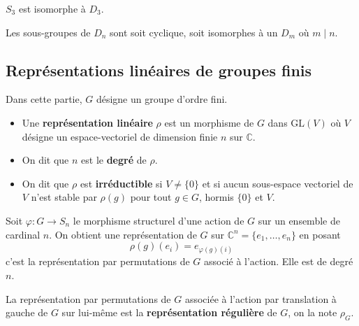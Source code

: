   \begin{example}
    $S_3$ est isomorphe à $D_3$.
  \end{example}


  \begin{proposition}
    Les sous-groupes de $D_n$ sont soit cyclique, soit isomorphes à un $D_m$ où $m \mid n$.
  \end{proposition}

  \subsection{Représentations linéaires de groupes finis}


  Dans cette partie, $G$ désigne un groupe d'ordre fini.

  \begin{definition}
    \begin{itemize}
      \item Une \textbf{représentation linéaire} $\rho$ est un morphisme de $G$ dans $\mathrm{GL}(V)$ où $V$ désigne un espace-vectoriel de dimension finie $n$ sur $\mathbb{C}$.
      \item On dit que $n$ est le \textbf{degré} de $\rho$.
      \item On dit que $\rho$ est \textbf{irréductible} si $V \neq \{ 0 \}$ et si aucun sous-espace vectoriel de $V$ n'est stable par $\rho(g)$ pour tout $g \in G$, hormis $\{ 0 \}$ et $V$.
    \end{itemize}
  \end{definition}

  \begin{example}
    Soit $\varphi : G \rightarrow S_n$ le morphisme structurel d'une action de $G$ sur un ensemble de cardinal $n$. On obtient une représentation de $G$ sur $\mathbb{C}^n = \{ e_1, \dots, e_n \}$ en posant
    \[ \rho(g)(e_i) = e_{\varphi(g)(i)} \]
    c'est la représentation par permutations de $G$ associé à l'action. Elle est de degré $n$.
  \end{example}

  \begin{definition}
    La représentation par permutations de $G$ associée à l'action par translation à gauche de $G$ sur lui-même est la \textbf{représentation régulière} de $G$, on la note $\rho_G$.
  \end{definition}



